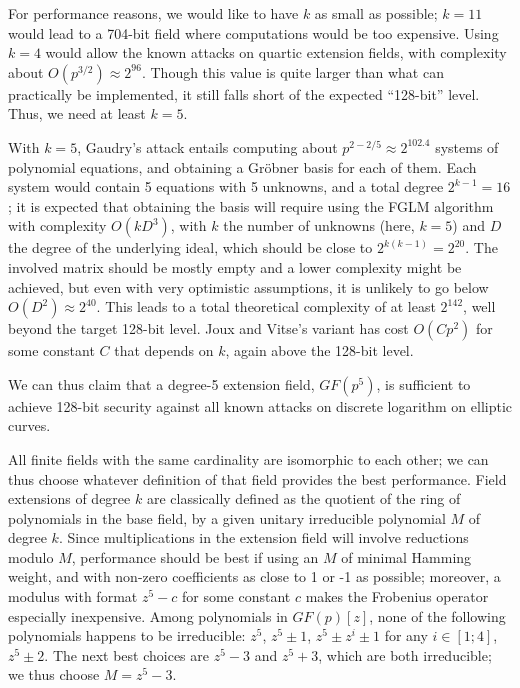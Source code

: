 \documentclass{llncs}
\newcommand{\GF}{GF}
\begin{document}
For performance reasons, we would like to have $k$ as small as possible;
$k = 11$ would lead to a 704-bit field where computations would be too
expensive. Using $k = 4$ would allow the known attacks on quartic
extension fields\cite{AriMatNagShi2004}, with complexity about
$O(p^{3/2}) \approx 2^{96}$. Though this value is quite larger than what
can practically be implemented, it still falls short of the expected
``128-bit'' level. Thus, we need at least $k = 5$.

With $k = 5$, Gaudry's attack entails computing about $p^{2-2/5} \approx
2^{102.4}$ systems of polynomial equations, and obtaining a Gröbner
basis for each of them. Each system would contain 5 equations with 5
unknowns, and a total degree $2^{k-1} = 16$; it is expected that
obtaining the basis will require using the FGLM
algorithm\cite{FauGiaLazMor1993} with complexity $O(k D^3)$, with $k$
the number of unknowns (here, $k = 5$) and $D$ the degree of the
underlying ideal, which should be close to $2^{k(k-1)} = 2^{20}$. The
involved matrix should be mostly empty and a lower complexity might be
achieved, but even with very optimistic assumptions, it is unlikely to
go below $O(D^2) \approx 2^{40}$. This leads to a total theoretical
complexity of at least $2^{142}$, well beyond the target 128-bit level.
Joux and Vitse's variant has cost $O(C p^2)$ for some constant $C$ that
depends on $k$, again above the 128-bit level.

We can thus claim that a degree-5 extension field, $\GF(p^5)$, is
sufficient to achieve 128-bit security against all known attacks on
discrete logarithm on elliptic curves.

All finite fields with the same cardinality are isomorphic to each other;
we can thus choose whatever definition of that field provides the best
performance. Field extensions of degree $k$ are classically defined as
the quotient of the ring of polynomials in the base field, by a given
unitary irreducible polynomial $M$ of degree $k$. Since multiplications
in the extension field will involve reductions modulo $M$, performance
should be best if using an $M$ of minimal Hamming weight, and with
non-zero coefficients as close to 1 or -1 as possible; moreover, a
modulus with format $z^5 - c$ for some constant $c$ makes the Frobenius
operator especially inexpensive. Among polynomials in $\GF(p)[z]$, none
of the following polynomials happens to be irreducible: $z^5$, $z^5 \pm
1$, $z^5 \pm z^i \pm 1$ for any $i \in [1;4]$, $z^5 \pm 2$. The next
best choices are $z^5 - 3$ and $z^5 + 3$, which are both irreducible; we
thus choose $M = z^5 - 3$.
\end{document}

